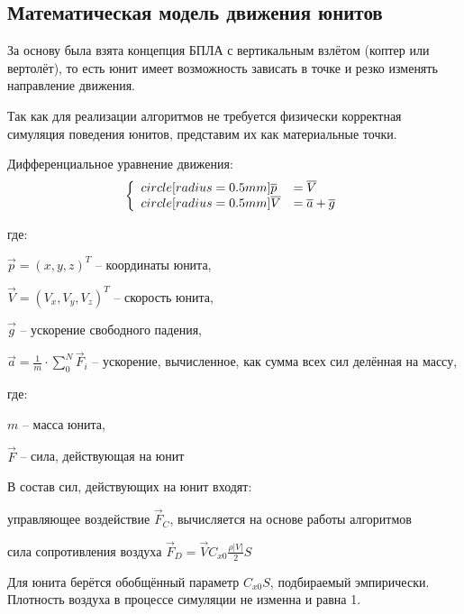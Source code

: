 \subsection{Математическая модель движения юнитов} \label{sec:unit_math_model}

За основу была взята концепция БПЛА с вертикальным взлётом (коптер или вертолёт),
то есть юнит имеет возможность зависать в точке и резко изменять направление движения.

Так как для реализации алгоритмов не требуется физически корректная симуляция
поведения юнитов, представим их как материальные точки.

Дифференциальное уравнение движения:
$$
\left\{
    \begin{array}{l l}
    \dot{\vec{p}}  & = \vec V \\
    \dot{\vec{V}}  & = \vec a + \vec g
    \end{array}
\right.
$$

где:

$\vec p = (x,y,z)^T$ -- координаты юнита,

$\vec V = (V_x,V_y,V_z)^T$ -- скорость юнита,

$\vec g$ -- ускорение свободного падения,

$\vec a = \frac{1}{m} \cdot \sum_0^N \vec F_i$ -- ускорение,
вычисленное, как сумма всех сил делённая на массу,

где:

$m$ -- масса юнита,

$\vec F$ -- сила, действующая на юнит

В состав сил, действующих на юнит входят:

\begin{mintemize}
\item управляющее воздействие $\vec F_C$, вычисляется на основе работы алгоритмов
\item сила сопротивления воздуха $\vec F_D = \vec V C_{x0} \frac{\rho |V|}{2} S$
\end{mintemize}

Для юнита берётся обобщённый параметр $C_{x0}S$, подбираемый эмпирически.
Плотность воздуха в процессе симуляции не изменна и равна 1.
